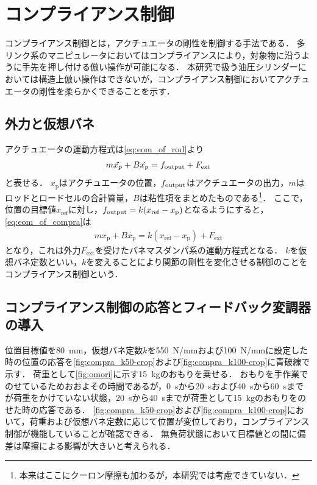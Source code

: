\clearpage
\section{コンプライアンス制御}
コンプライアンス制御とは，アクチュエータの剛性を制御する手法である\cite{松野_大須賀_松原_野田_稲見201712,吉川198811,谷江和雄1989コンプライアンス制御と柔軟接触問題}．
多リンク系のマニピュレータにおいてはコンプライアンスにより，対象物に沿うように手先を押し付ける倣い操作が可能になる．
本研究で扱う油圧シリンダーにおいては構造上倣い操作はできないが，コンプライアンス制御においてアクチュエータの剛性を柔らかくできることを示す．
\subsection{外力と仮想バネ}
アクチュエータの運動方程式は\eqnname\eqref{eq:eom_of_rod}より
\begin{align}
    \label{eq:eom_of_compra}
    m\ddot{x_\mathrm{p}} + B\dot{x_\mathrm{p}} = f_\mathrm{output} +F_\mathrm{ext}
\end{align}
と表せる．
$x_\mathrm{p}$はアクチュエータの位置，$f_\mathrm{output}$はアクチュエータの出力，$m$はロッドとロードセルの合計質量，$B$は粘性項をまとめたものである\footnote{本来はここにクーロン摩擦も加わるが，本研究では考慮できていない．}．
ここで，位置の目標値$x_\mathrm{ref}$に対し，$f_\mathrm{output} = k(x_\mathrm{ref}-x_\mathrm{p})$となるようにすると，\eqnname\eqref{eq:eom_of_compra}は
\begin{align}
    \label{eq:hoge}
    m\ddot{x_\mathrm{p}} + B\dot{x_\mathrm{p}} = k(x_\mathrm{ref}-x_\mathrm{p}) +F_\mathrm{ext}
\end{align}
となり，これは外力$F_\mathrm{ext}$を受けたバネマスダンパ系の運動方程式となる．
$k$を仮想バネ定数といい，$k$を変えることにより関節の剛性を変化させる制御のことをコンプライアンス制御という．

\subsection{コンプライアンス制御の応答とフィードバック変調器の導入}
位置目標値を\SI{80}{mm}，仮想バネ定数$k$を5\SI{50}{N/mm}および\SI{100}{N/mm}に設定した時の位置の応答を\figname\ref{fig:compra_k50-crop}および\figname\ref{fig:compra_k100-crop}に青破線で示す．
荷重として\figname\ref{fig:omori}に示す\SI{15}{kg}のおもりを乗せる．
おもりを手作業でのせているためおおよその時間であるが，\SI{0}{s}から\SI{20}{s}および\SI{40}{s}から\SI{60}{s}までが荷重をかけていない状態，\SI{20}{s}から\SI{40}{s}までが荷重として\SI{15}{kg}のおもりをのせた時の応答である．
\figname\ref{fig:compra_k50-crop}および\figname\ref{fig:compra_k100-crop}において，荷重および仮想バネ定数に応じて位置が変位しており，コンプライアンス制御が機能していることが確認できる．
無負荷状態において目標値との間に偏差は摩擦による影響が大きいと考えられる．


